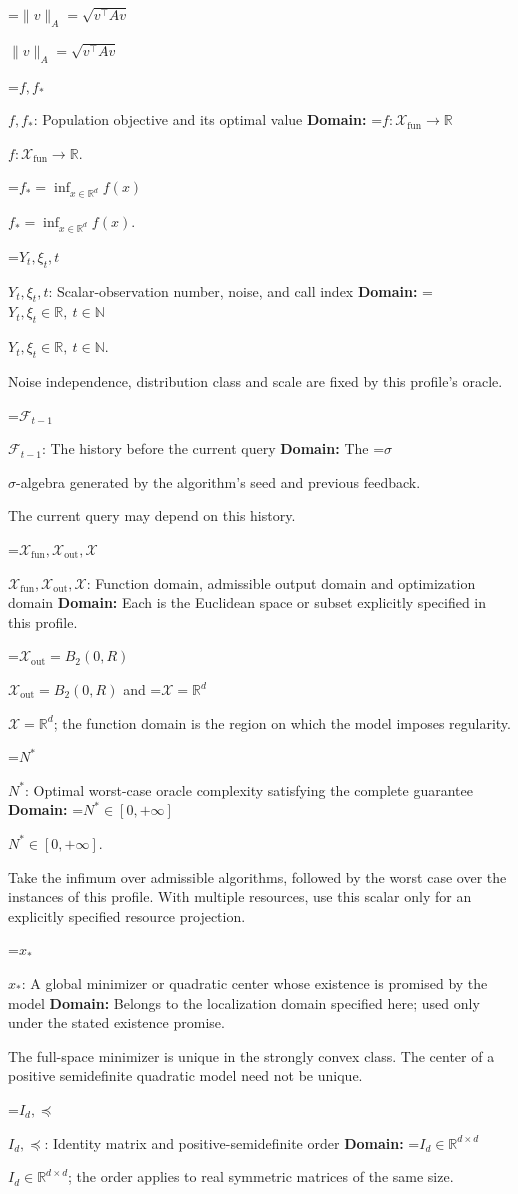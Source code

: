 \documentclass[10pt,a4paper]{article}
\newcommand{\AtlasMath}[1]{\par\begingroup\centering\setbox0=\hbox{$\displaystyle #1$}\ifdim\wd0>1.4\linewidth\typeout{ATLAS WIDE FORMULA: \the\wd0}\fi\ifdim\wd0>\linewidth\resizebox{\linewidth}{!}{\box0}\else\box0\fi\par\endgroup}
\newcommand{\AtlasInlineMath}[1]{\begingroup\setbox0=\hbox{$#1$}\ifdim\wd0>.4\linewidth\endgroup\AtlasMath{#1}\else\endgroup$#1$\fi}
\begin{document}
\AtlasInlineMath{\|v\|_A=\sqrt{v^\top Av}}

\AtlasInlineMath{f,f_*}: Population objective and its optimal value \textbf{Domain:} \AtlasInlineMath{f:\mathcal{X}_{\mathrm{fun}}\to\mathbb{R}}.

\AtlasInlineMath{f_*=\inf_{x\in \mathbb{R}^d}f(x)}.

\AtlasInlineMath{Y_t,\xi_t,t}: Scalar-observation number, noise, and call index \textbf{Domain:} \AtlasInlineMath{Y_t,\xi_t\in\mathbb{R},\ t\in\mathbb{N}}.

Noise independence, distribution class and scale are fixed by this profile's oracle.

\AtlasInlineMath{\mathcal{F}_{t-1}}: The history before the current query \textbf{Domain:} The \AtlasInlineMath{\sigma}-algebra generated by the algorithm's seed and previous feedback.

The current query may depend on this history.

\AtlasInlineMath{\mathcal{X}_{\mathrm{fun}},\mathcal{X}_{\mathrm{out}},\mathcal{X}}: Function domain, admissible output domain and optimization domain \textbf{Domain:} Each is the Euclidean space or subset explicitly specified in this profile.

\AtlasInlineMath{\mathcal{X}_{\mathrm{out}}=B_2(0,R)} and \AtlasInlineMath{\mathcal{X}=\mathbb{R}^d}; the function domain is the region on which the model imposes regularity.

\AtlasInlineMath{N^*}: Optimal worst-case oracle complexity satisfying the complete guarantee \textbf{Domain:} \AtlasInlineMath{N^*\in[0,+\infty]}.

Take the infimum over admissible algorithms, followed by the worst case over the instances of this profile. With multiple resources, use this scalar only for an explicitly specified resource projection.

\AtlasInlineMath{x_*}: A global minimizer or quadratic center whose existence is promised by the model \textbf{Domain:} Belongs to the localization domain specified here; used only under the stated existence promise.

The full-space minimizer is unique in the strongly convex class. The center of a positive semidefinite quadratic model need not be unique.

\AtlasInlineMath{I_d,\preceq}: Identity matrix and positive-semidefinite order \textbf{Domain:} \AtlasInlineMath{I_d\in\mathbb{R}^{d\times d}}; the order applies to real symmetric matrices of the same size.
\end{document}
